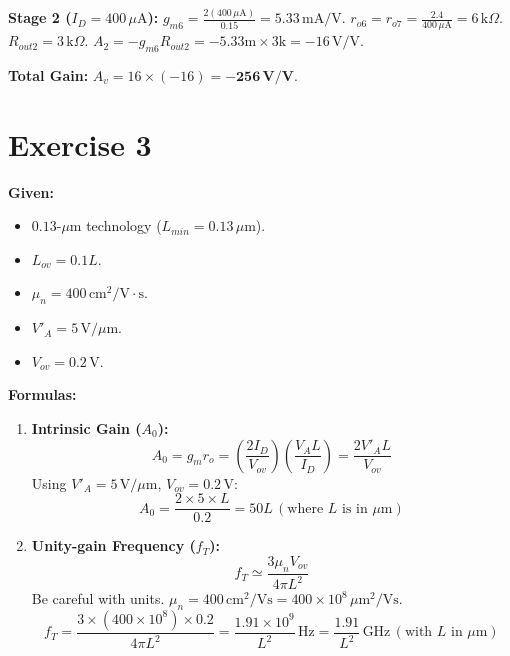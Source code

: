 \documentclass[11pt, a4paper]{article}
\newcommand{\uA}{\,\mu\text{A}}
\newcommand{\mA}{\,\text{mA}}
\newcommand{\kohm}{\,\text{k}\Omega}
\begin{document}
\textbf{Stage 2 ($I_D=400 \uA$):}
$g_{m6} = \frac{2(400 \uA)}{0.15} = 5.33 \mA/\text{V}$.
$r_{o6} = r_{o7} = \frac{2.4}{400 \uA} = 6 \kohm$.
$R_{out2} = 3 \kohm$.
$A_2 = -g_{m6} R_{out2} = -5.33\text{m} \times 3\text{k} = -16\,\text{V/V}$.

\textbf{Total Gain:} $A_v = 16 \times (-16) = \mathbf{-256\,\text{V/V}}$.

\section*{Exercise 3}

\textbf{Given:}
\begin{itemize}
    \item $0.13\text{-}\mu\text{m}$ technology ($L_{min} = 0.13\,\mu\text{m}$).
    \item $L_{ov} = 0.1 L$.
    \item $\mu_n = 400\,\text{cm}^2/\text{V}\cdot\text{s}$.
    \item $V'_A = 5\,\text{V}/\mu\text{m}$.
    \item $V_{ov} = 0.2\,\text{V}$.
\end{itemize}

\textbf{Formulas:}
\begin{enumerate}
    \item \textbf{Intrinsic Gain ($A_0$):}
    \[ A_0 = g_m r_o = \left(\frac{2 I_D}{V_{ov}}\right) \left(\frac{V_A L}{I_D}\right) = \frac{2 V'_A L}{V_{ov}} \]
    Using $V'_A = 5\,\text{V}/\mu\text{m}$, $V_{ov} = 0.2\,\text{V}$:
    \[ A_0 = \frac{2 \times 5 \times L}{0.2} = 50 L \, (\text{where } L \text{ is in } \mu\text{m}) \]

    \item \textbf{Unity-gain Frequency ($f_T$):}
    \[ f_T \simeq \frac{3 \mu_n V_{ov}}{4 \pi L^2} \]
    Be careful with units. $\mu_n = 400\,\text{cm}^2/\text{Vs} = 400 \times 10^8\,\mu\text{m}^2/\text{Vs}$.
    \[ f_T = \frac{3 \times (400 \times 10^8) \times 0.2}{4 \pi L^2} = \frac{1.91 \times 10^9}{L^2}\,\text{Hz} = \frac{1.91}{L^2}\,\text{GHz} \, (\text{with } L \text{ in } \mu\text{m}) \]
\end{enumerate}
\end{document}
